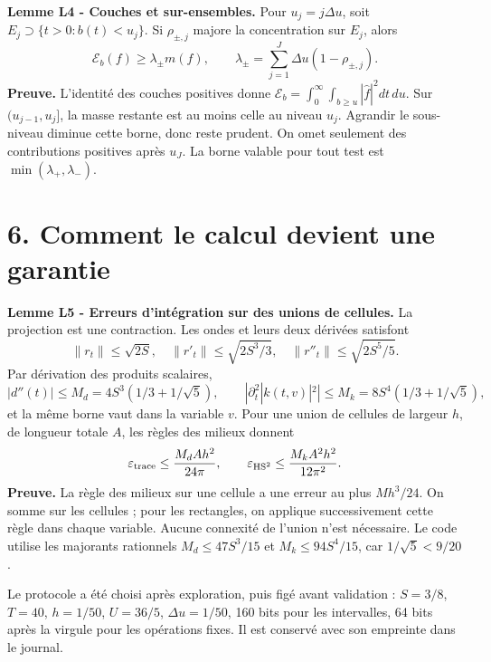 \documentclass[
  10pt,
  a4paper,
]{article}
\begin{document}
\textbf{Lemme L4 - Couches et sur-ensembles.} Pour \(u_j=j\Delta u\),
soit \(E_j\supset\{t>0:b(t)<u_j\}\). Si \(\rho_{\pm,j}\) majore la
concentration sur \(E_j\), alors \[
\mathcal E_b(f)\ge\lambda_\pm m(f),\qquad
\lambda_\pm=\sum_{j=1}^J\Delta u(1-\rho_{\pm,j}).
\] \textbf{Preuve.} L'identité des couches positives donne
\(\mathcal E_b=\int_0^\infty\int_{b\ge u}|\widehat f|^2dt\,du\). Sur
\((u_{j-1},u_j]\), la masse restante est au moins celle au niveau
\(u_j\). Agrandir le sous-niveau diminue cette borne, donc reste
prudent. On omet seulement des contributions positives après \(u_J\). La
borne valable pour tout test est \(\min(\lambda_+,\lambda_-)\).

\hypertarget{comment-le-calcul-devient-une-garantie}{%
\section{6. Comment le calcul devient une
garantie}\label{comment-le-calcul-devient-une-garantie}}

\textbf{Lemme L5 - Erreurs d'intégration sur des unions de cellules.} La
projection est une contraction. Les ondes et leurs deux dérivées
satisfont \[
\|r_t\|\le\sqrt{2S},\quad
\|r'_t\|\le\sqrt{2S^3/3},\quad
\|r''_t\|\le\sqrt{2S^5/5}.
\] Par dérivation des produits scalaires, \[
|d''(t)|\le M_d=4S^3(1/3+1/\sqrt5),\qquad
|\partial_t^2|k(t,v)|^2|\le M_k=8S^4(1/3+1/\sqrt5),
\] et la même borne vaut dans la variable \(v\). Pour une union de
cellules de largeur \(h\), de longueur totale \(A\), les règles des
milieux donnent \[
\varepsilon_{\rm trace}\le\frac{M_dAh^2}{24\pi},\qquad
\varepsilon_{{\rm HS}^2}\le\frac{M_kA^2h^2}{12\pi^2}.
\] \textbf{Preuve.} La règle des milieux sur une cellule a une erreur au
plus \(Mh^3/24\). On somme sur les cellules ; pour les rectangles, on
applique successivement cette règle dans chaque variable. Aucune
connexité de l'union n'est nécessaire. Le code utilise les majorants
rationnels \(M_d\le47S^3/15\) et \(M_k\le94S^4/15\), car
\(1/\sqrt5<9/20\).

Le protocole a été choisi après exploration, puis figé avant validation
: \(S=3/8\), \(T=40\), \(h=1/50\), \(U=36/5\), \(\Delta u=1/50\), 160
bits pour les intervalles, 64 bits après la virgule pour les opérations
fixes. Il est conservé avec son empreinte dans le journal.
\end{document}
